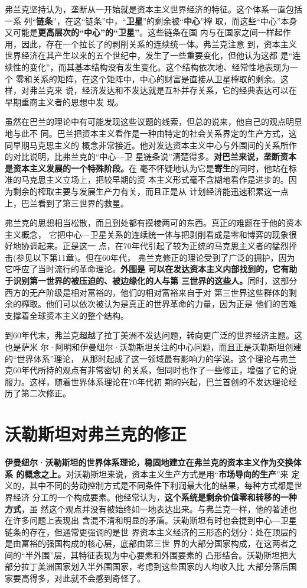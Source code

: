弗兰克坚持认为，垄断从一开始就是资本主义世界经济的特征。这个体系一直包括一系
列“\textbf{链条}”，在这“链条”中，“\textbf{卫星}”的剩余被“\textbf{中心}”榨
取，而这些“中心”本身又可能是\textbf{更高层次的“中心”的“卫星”}。这些链条在国
内与在国家之间一样起作用，因此，存在一个拉长了的剥削关系的连续统一体。弗兰克注意
到，资本主义世界经济在其产生以来的五个世纪中，发生了一些重要变化，但他认为这都
是“连续性的变化”，而其基本结构没有发生变化。这个结构依次地、经常性地表现为一个
零和关系的矩阵，在这个矩阵中，中心的财富是直接从卫星榨取的剩余。这样，对弗兰克来
说，经济发达和不发达就是互补并存关系，它的经典表达可以在早期重商主义者的思想中发
现。

虽然在巴兰的理论中有可能发现这些议题的线索，但总的说来，他自己的观点明显地与此不
同。巴兰把资本主义看作是一种由特定的社会关系界定的生产方式，这同早期马克思主义的
概念非常接近。他对发达资本主义中心与外围间的关系所作的对比说明，比弗兰克的“中心—卫
星链条说”清楚得多。\textbf{对巴兰来说，垄断资本是资本主义发展的一个特殊阶段。}在
毫不怀疑地认为它是\textbf{寄生}的同时，他站在标准的马克思主义立场上，把较早期的资
本主义形式毫不含糊地看作是进步的。因为剩余的榨取主要与发展生产力有关，而且正是从
计划经济能迅速积累这一点上，巴兰看到了第三世界的救星。

弗兰克的思想相当松散，而且到处都有摸棱两可的东西。真正的难题在于他的资本主义概念，
它把中心—卫星关系的连续统一体与把剥削看成是零和博弈的现象很好地协调起来。正是这一
点，在70年代引起了较为正统的马克思主义者的猛烈抨击(参见以下第11章)。但在60年代，
弗兰克修正的理论受到了广泛的拥护，因为它呼应了当时流行的革命理论。\textbf{外围是
  可以在发达资本主义内部找到的，它有助于识别第一世界的被压迫的、被边缘化的人与第
  三世界的这些人。}同时，这部分西方的无产阶级是相对富裕的，他们的相对富裕来自于对
第三世界这些群体的剩余的榨取。他们可以依次被认为是真正的世界革命的力量，因为正是
他们的苦难支撑着全球资本主义的整个结构。

到60年代末，弗兰克超越了拉丁美洲不发达问题，转向更广泛的世界经济主题。这也是萨米
尔·阿明和伊曼纽尔·沃勒斯坦关注的中心问题，而且正是沃勒斯坦创建的“世界体系”理论，
从那时起成了这一领域最有影响力的学说。这个理论与弗兰克60年代所持的观点有非常密切
的关系，但同时也作了一些修正，增强了它的说服力。这样，随着世界体系理论在70年代初
期的兴起，巴兰首创的不发达理论经历了第二次修正。

\section{沃勒斯坦对弗兰克的修正}

\textbf{伊曼纽尔·沃勒斯坦的世界体系理论，稳固地建立在弗兰克的资本主义作为交换体系
  的概念之上。}对沃勒斯坦来说，资本主义生产方式是用“\textbf{市场导向的生产}”来
定义的，其中不同的劳动控制方式是不同条件下利润最大化的结果，每种方式都是世界经济
分工的一个构成要素。他经常认为，\textbf{这个系统是剩余价值零和转移的一种方式}，虽
然这个观点并没有被始终如一地表达出来。与弗兰克一样，他的著述也在许多问题上表现出
含混不清和明显的矛盾。沃勒斯坦有时也会提到中心—卫星链条的存在，但通常更强调的是世
界资本主义经济的三形态的划分：处在顶层的是由富裕的强国构成的核心层，底部由第三世
界的大部分国家构成，在这两者之间的“半外围”层，其特征表现为中心要素和外围要素的
凸形结合。沃勒斯坦把大部分拉丁美洲国家划入半外围国家，考虑到这些国家的人均收入比
大部分落后国家要高得多，对此就不会感到奇怪了。

